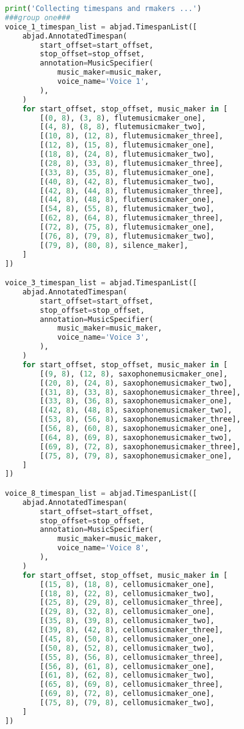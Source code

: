 \begin{lstlisting}[language=Python, caption=Four Ages of Sand Segment\_IV]
print('Collecting timespans and rmakers ...')
###group one###
voice_1_timespan_list = abjad.TimespanList([
    abjad.AnnotatedTimespan(
        start_offset=start_offset,
        stop_offset=stop_offset,
        annotation=MusicSpecifier(
            music_maker=music_maker,
            voice_name='Voice 1',
        ),
    )
    for start_offset, stop_offset, music_maker in [
        [(0, 8), (3, 8), flutemusicmaker_one],
        [(4, 8), (8, 8), flutemusicmaker_two],
        [(10, 8), (12, 8), flutemusicmaker_three],
        [(12, 8), (15, 8), flutemusicmaker_one],
        [(18, 8), (24, 8), flutemusicmaker_two],
        [(28, 8), (33, 8), flutemusicmaker_three],
        [(33, 8), (35, 8), flutemusicmaker_one],
        [(40, 8), (42, 8), flutemusicmaker_two],
        [(42, 8), (44, 8), flutemusicmaker_three],
        [(44, 8), (48, 8), flutemusicmaker_one],
        [(54, 8), (55, 8), flutemusicmaker_two],
        [(62, 8), (64, 8), flutemusicmaker_three],
        [(72, 8), (75, 8), flutemusicmaker_one],
        [(76, 8), (79, 8), flutemusicmaker_two],
        [(79, 8), (80, 8), silence_maker],
    ]
])

voice_3_timespan_list = abjad.TimespanList([
    abjad.AnnotatedTimespan(
        start_offset=start_offset,
        stop_offset=stop_offset,
        annotation=MusicSpecifier(
            music_maker=music_maker,
            voice_name='Voice 3',
        ),
    )
    for start_offset, stop_offset, music_maker in [
        [(9, 8), (12, 8), saxophonemusicmaker_one],
        [(20, 8), (24, 8), saxophonemusicmaker_two],
        [(31, 8), (33, 8), saxophonemusicmaker_three],
        [(33, 8), (36, 8), saxophonemusicmaker_one],
        [(42, 8), (48, 8), saxophonemusicmaker_two],
        [(53, 8), (56, 8), saxophonemusicmaker_three],
        [(56, 8), (60, 8), saxophonemusicmaker_one],
        [(64, 8), (69, 8), saxophonemusicmaker_two],
        [(69, 8), (72, 8), saxophonemusicmaker_three],
        [(75, 8), (79, 8), saxophonemusicmaker_one],
    ]
])

voice_8_timespan_list = abjad.TimespanList([
    abjad.AnnotatedTimespan(
        start_offset=start_offset,
        stop_offset=stop_offset,
        annotation=MusicSpecifier(
            music_maker=music_maker,
            voice_name='Voice 8',
        ),
    )
    for start_offset, stop_offset, music_maker in [
        [(15, 8), (18, 8), cellomusicmaker_one],
        [(18, 8), (22, 8), cellomusicmaker_two],
        [(25, 8), (29, 8), cellomusicmaker_three],
        [(29, 8), (32, 8), cellomusicmaker_one],
        [(35, 8), (39, 8), cellomusicmaker_two],
        [(39, 8), (42, 8), cellomusicmaker_three],
        [(45, 8), (50, 8), cellomusicmaker_one],
        [(50, 8), (52, 8), cellomusicmaker_two],
        [(55, 8), (56, 8), cellomusicmaker_three],
        [(56, 8), (61, 8), cellomusicmaker_one],
        [(61, 8), (62, 8), cellomusicmaker_two],
        [(65, 8), (69, 8), cellomusicmaker_three],
        [(69, 8), (72, 8), cellomusicmaker_one],
        [(75, 8), (79, 8), cellomusicmaker_two],
    ]
])


\end{lstlisting}
